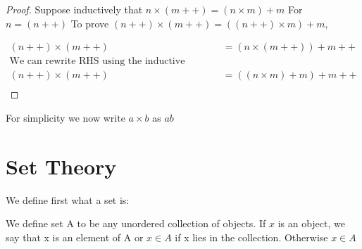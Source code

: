 \documentclass[11pt]{report}
\begin{document}
\begin{proof}
Suppose inductively that $n \times (m++) = (n \times m) + m$
For $n = (n++)$
To prove $(n++) \times (m++) = ((n++) \times m) + m$,

\begin{align*}
(n++) \times (m++) &= (n \times (m++)) + m++ \\
\text{We can rewrite RHS using the inductive hypothesis} \\
(n++) \times (m++) &= ((n \times m) + m) + m++\\

\end{align*}
\end{proof}

For simplicity we now write \(a \times b\) as \(ab\)
\chapter{Set Theory}
\label{sec:org5d3fae8}
We define first what a set is:

\begin{definition}[Sets]
We define set A to be any unordered collection of objects. If $x$ is an object, we say that x is an element of A or $x \in A$ if x lies in the collection. Otherwise $x \in A$
\end{definition}
\end{document}
